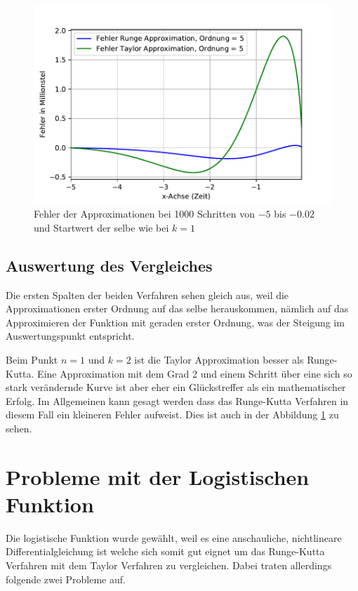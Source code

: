 \begin{figure}
	\centering
	\includegraphics[width=12cm]{papers/taylor/taylorPictures/FehlerRungeUndTaylor.pdf}
	\caption{Fehler der Approximationen bei 1000 Schritten von $-5$ bis $-0.02$ und Startwert der selbe wie bei $k=1$}
	\label{taylor:section:fig:FehlerRungeTaylor}
\end{figure}

\subsection{Auswertung des Vergleiches}
\label{taylor:subsection:Auswertung}
Die ersten Spalten der beiden Verfahren sehen gleich aus, weil die Approximationen erster Ordnung auf das selbe herauskommen, nämlich auf das Approximieren der Funktion mit geraden erster Ordnung, was der Steigung im Auswertungspunkt entspricht.

Beim Punkt $n=1$ und $k=2$ ist die Taylor Approximation besser als Runge-Kutta.
Eine Approximation mit dem Grad 2 und einem Schritt über eine sich so stark verändernde Kurve ist aber eher ein Glückstreffer als ein mathematischer Erfolg.
Im Allgemeinen kann gesagt werden dass das Runge-Kutta Verfahren in diesem Fall ein kleineren Fehler aufweist. Dies ist auch in der Abbildung \ref{taylor:section:fig:FehlerRungeTaylor} zu sehen.

\section{Probleme mit der Logistischen Funktion}
\label{taylor:subsection:Probleme}
Die logistische Funktion wurde gewählt, weil es eine anschauliche, nichtlineare Differentialgleichung ist welche sich somit gut eignet um das Runge-Kutta Verfahren mit dem Taylor Verfahren zu vergleichen.
Dabei traten allerdings folgende zwei Probleme auf.

